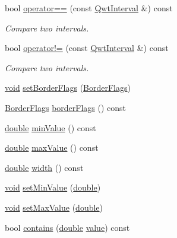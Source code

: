 \begin{DoxyCompactItemize}
\item 
bool \hyperlink{class_qwt_interval_aec5aa21ab413fb5bfaa3360fae02e6b2}{operator==} (const \hyperlink{class_qwt_interval}{Qwt\-Interval} \&) const 
\begin{DoxyCompactList}\small\item\em Compare two intervals. \end{DoxyCompactList}\item 
bool \hyperlink{class_qwt_interval_a4c1cb8360a05c1875f7957f00d3bdf16}{operator!=} (const \hyperlink{class_qwt_interval}{Qwt\-Interval} \&) const 
\begin{DoxyCompactList}\small\item\em Compare two intervals. \end{DoxyCompactList}\item 
\hyperlink{group___u_a_v_objects_plugin_ga444cf2ff3f0ecbe028adce838d373f5c}{void} \hyperlink{class_qwt_interval_ad1bce23251519f0d44937413f8547dc5}{set\-Border\-Flags} (\hyperlink{class_qwt_interval_a678a26fcaa91cca596d9aebcbf5776c9}{Border\-Flags})
\item 
\hyperlink{class_qwt_interval_a678a26fcaa91cca596d9aebcbf5776c9}{Border\-Flags} \hyperlink{class_qwt_interval_a885306d2a8538fe37c1446853aa18018}{border\-Flags} () const 
\item 
\hyperlink{_super_l_u_support_8h_a8956b2b9f49bf918deed98379d159ca7}{double} \hyperlink{class_qwt_interval_a173c9193bd16f99589db60326df04310}{min\-Value} () const 
\item 
\hyperlink{_super_l_u_support_8h_a8956b2b9f49bf918deed98379d159ca7}{double} \hyperlink{class_qwt_interval_aac7cffc81147c07efc4a95c2e6222a1a}{max\-Value} () const 
\item 
\hyperlink{_super_l_u_support_8h_a8956b2b9f49bf918deed98379d159ca7}{double} \hyperlink{class_qwt_interval_a7cded184fdbb9e30756f422ceca7522e}{width} () const 
\item 
\hyperlink{group___u_a_v_objects_plugin_ga444cf2ff3f0ecbe028adce838d373f5c}{void} \hyperlink{class_qwt_interval_ab993dac41ca70402e0cb4f9f980d90f0}{set\-Min\-Value} (\hyperlink{_super_l_u_support_8h_a8956b2b9f49bf918deed98379d159ca7}{double})
\item 
\hyperlink{group___u_a_v_objects_plugin_ga444cf2ff3f0ecbe028adce838d373f5c}{void} \hyperlink{class_qwt_interval_a3eeedaf35966d535670863cb0f97613a}{set\-Max\-Value} (\hyperlink{_super_l_u_support_8h_a8956b2b9f49bf918deed98379d159ca7}{double})
\item 
bool \hyperlink{class_qwt_interval_a862ee5d96ed32b991a0bbeed0e836560}{contains} (\hyperlink{_super_l_u_support_8h_a8956b2b9f49bf918deed98379d159ca7}{double} \hyperlink{glext_8h_aa0e2e9cea7f208d28acda0480144beb0}{value}) const 

\end{DoxyCompactItemize}
